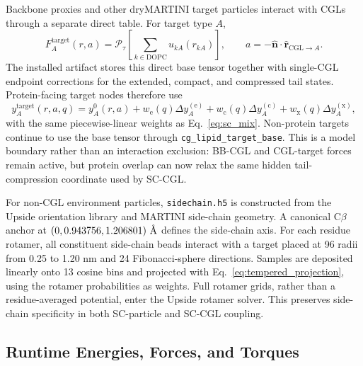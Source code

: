 \documentclass{article}
\newcommand{\angstrom}{\text{\normalfont\AA}}
\begin{document}
Backbone proxies and other dryMARTINI target particles interact with CGLs
through a separate direct table.  For target type $A$,
\begin{equation}
F_A^{\mathrm{target}}(r,a)=\mathcal P_{\tau}
\left[\sum_{k\in\mathrm{DOPC}}u_{kA}(r_{kA})\right],
\qquad a=-\hat{\mathbf n}\cdot\hat{\mathbf r}_{\mathrm{CGL}\rightarrow A}.
\label{eq:target_table}
\end{equation}
The installed artifact stores this direct base tensor together with
single-CGL endpoint corrections for the extended, compact, and compressed tail
states.  Protein-facing target nodes therefore use
\begin{equation}
y_A^{\mathrm{target}}(r,a,q)=y_A^{0}(r,a)
+w_{\mathrm e}(q)\Delta y_A^{(\mathrm e)}
+w_{\mathrm c}(q)\Delta y_A^{(\mathrm c)}
+w_{\mathrm x}(q)\Delta y_A^{(\mathrm x)},
\label{eq:target_q_table}
\end{equation}
with the same piecewise-linear weights as Eq.~\ref{eq:sc_mix}.  Non-protein
targets continue to use the base tensor through \texttt{cg\_lipid\_target\_base}.
This is a model boundary rather than an interaction exclusion: BB-CGL and
CGL-target forces remain active, but protein overlap can now relax the same
hidden tail-compression coordinate used by SC-CGL.

For non-CGL environment particles, \texttt{sidechain.h5} is constructed from
the Upside orientation library and MARTINI side-chain geometry.  A canonical
C$\beta$ anchor at $(0,0.943756,1.206801)~\angstrom$ defines the side-chain
axis.  For each residue rotamer, all constituent side-chain beads interact
with a target placed at 96 radii from 0.25 to 1.20 nm and 24 Fibonacci-sphere
directions.  Samples are deposited linearly onto 13 cosine bins and projected
with Eq.~\ref{eq:tempered_projection}, using the rotamer probabilities as
weights.  Full rotamer grids, rather than a residue-averaged potential, enter
the Upside rotamer solver.  This preserves side-chain specificity in both
SC-particle and SC-CGL coupling.

\subsection{Runtime Energies, Forces, and Torques}
\end{document}
